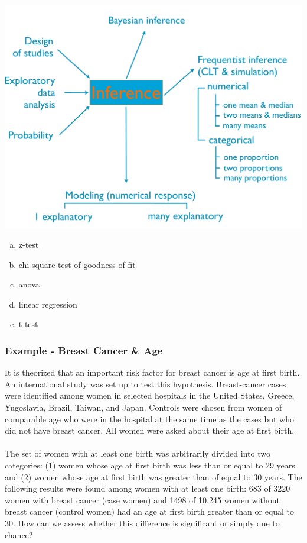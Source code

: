 \documentclass[11pt,containsverbatim,handout,xcolor=xelatex,dvipsnames,table]{beamer}
\newcommand{\solnMult}[1]{#1}
\begin{document}
\begin{frame}

{
{\scriptsize
{}}}
{
 \includegraphics[width=\textwidth]{figures/map/inference}
}

\begin{enumerate}[(a)]
\item z-test
\item chi-square test of goodness of fit
\item \solnMult{anova}
\item \solnMult{linear regression}
\item t-test
\end{enumerate}

\end{frame}


\begin{frame}[shrink]
\frametitle{Example - Breast Cancer \& Age}

{\small
It is theorized that an important risk factor for breast cancer is age at first birth. An international study was set up to test this hypothesis. Breast-cancer cases were identified among women in selected hospitals in the United States, Greece, Yugoslavia, Brazil, Taiwan, and Japan. Controls were chosen from women of comparable age who were in the hospital at the same time as the cases but who did not have breast cancer. All women were asked about their age at first birth.\\
~\\
The set of women with at least one birth was arbitrarily divided into two categories: (1) women whose age at first birth was less than or equal to 29 years and (2) women whose age at first birth was greater than of equal to 30 years. The following results were found among women with at least one birth: 683 of 3220 women with breast cancer (case women) and 1498 of 10,245 women without breast cancer (control women) had an age at first birth greater than or equal to 30. How can we assess whether this difference is significant or simply due to chance?\\
}
\end{frame}
\end{document}

